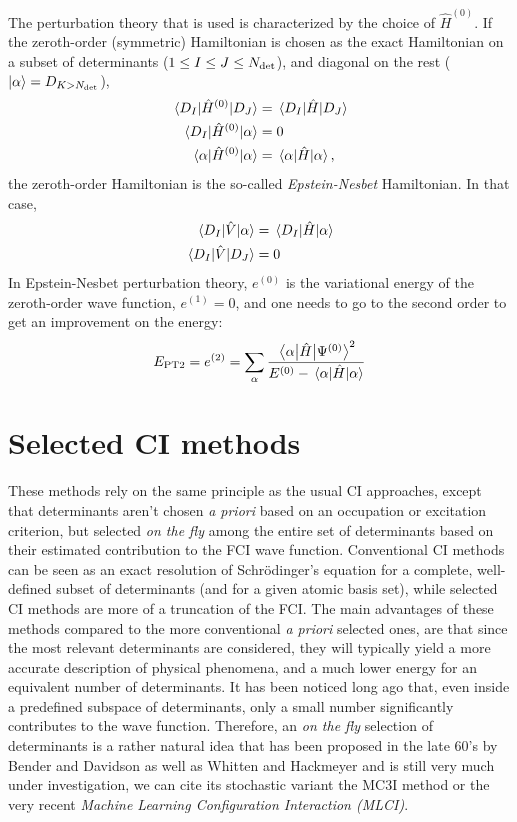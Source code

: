 \documentclass[./thesis.tex]{subfiles}
\begin{document}
The perturbation theory that is used is characterized by the choice of $\hat{H}^{(0)}$.
If the zeroth-order (symmetric) Hamiltonian is chosen as the exact Hamiltonian on a subset of determinants ($1 \le I \le J \le {N_\text{det}}$), and diagonal on the rest (${\ket{\alpha}} = D_{K > {N_\text{det}}}$), 
\begin{align}
\mel{D_I}{\hat{H}^{(0)}}{D_J} & = \mel{D_I}{\hat{H}}{D_J} \\
\mel{D_I}{\hat{H}^{(0)}}{\alpha} & = 0 \\
\mel{\alpha}{\hat{H}^{(0)}}{\alpha} & = \mel{\alpha}{\hat{H}}{\alpha}, \\
\end{align}
the zeroth-order Hamiltonian is the so-called \emph{Epstein-Nesbet} Hamiltonian. In that case,
\begin{align}
\mel{D_I}{\hat{V}}{\alpha} & = \mel{D_I}{\hat{H}}{\alpha} \\
\mel{D_I}{\hat{V}}{D_J} & = 0 \\
\end{align}
In Epstein-Nesbet perturbation theory, $e^{(0)}$ is the variational energy of
the zeroth-order wave function, $e^{(1)} = 0$, and one needs to go to the second
order to get an improvement on the energy:
\begin{equation}
E_\text{PT2} = e^{(2)} = \sum_{\alpha} \frac{\mel{\alpha}{\hat{H}}{\Psi^{(0)}}^2}{E^{(0)} - \mel{\alpha}{\hat{H}}{\alpha}}
\end{equation}



\section{Selected CI methods}
\label{sec:meth_cipsi}

These methods rely on the same principle as the usual CI approaches, except that determinants aren't chosen \textit{a priori} based on an occupation or excitation criterion, but selected \emph{on the fly} among the entire set of determinants based on their estimated contribution to the FCI wave function. Conventional CI methods can be seen as an exact resolution of Schrödinger's equation for a complete, well-defined subset of determinants (and for a given atomic basis set), while selected CI methods are more of a truncation of the FCI.
The main advantages of these methods compared to the more conventional \textit{a priori} selected ones, are that since the most relevant determinants are considered, they will typically yield a more accurate description of physical phenomena, and a much lower energy for an equivalent number of determinants.
It has been noticed long ago that, even inside a predefined subspace of determinants, only a small number significantly contributes to the wave function.\cite{Bytautas_2009,Anderson_2018} Therefore, an \emph{on the fly} selection of determinants is a rather natural idea that has been proposed in the late 60's by Bender and Davidson\cite{Bender_1969} as well as Whitten and Hackmeyer\cite{Whitten_1969} and is still very much under investigation, we can cite its stochastic variant the MC3I method\cite{Ohtsuka_2017} or the very recent \emph{Machine Learning Configuration Interaction (MLCI)}.\cite{1808.05787}
\end{document}
